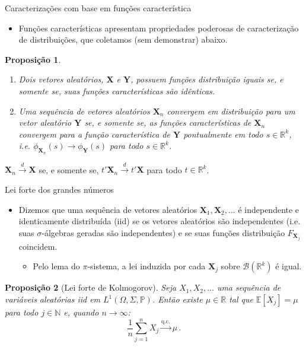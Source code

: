 \documentclass[11pt]{beamer}
\newtheorem{proposition}{Proposição}
\begin{document}
	\begin{frame}{Caracterizações com base em funções característica}
		\begin{itemize}
			\item Funções características apresentam propriedades poderosas de caracterização de distribuições, que coletamos (sem demonstrar) abaixo.
		\end{itemize}
		\begin{proposition}
		\begin{enumerate}
			\item Dois vetores aleatórios, $\boldsymbol{X}$ e $\boldsymbol{Y}$, possuem funções distribuição iguais se, e somente se, suas funções características são idênticas.
			\item Uma sequência de vetores aleatórios $\boldsymbol{X}_n$ convergem em distribuição para um vetor aleatório $\boldsymbol{Y}$ se, e somente se, as funções características de $\boldsymbol{X}_n$ convergem para a função característica de $\boldsymbol{Y}$ pontualmente em todo $s \in \mathbb{R}^k$, i.e. $\phi_{\boldsymbol{X}_n}(s) \to \phi_{\boldsymbol{Y}}(s)$ para todo $s \in \mathbb{R}^k$. 
		\end{enumerate}
		\end{proposition}
		\begin{corollary}
			$\boldsymbol{X}_n \overset{d}{\to} \boldsymbol{X}$ se, e somente se, $t'\boldsymbol{X}_n  \overset{d}{\to} t'\boldsymbol{X}$ para todo $t \in \mathbb{R}^k$.
		\end{corollary}
	\end{frame}
	
	\begin{frame}{Lei forte dos grandes números}
		\begin{itemize}
			\item Dizemos que uma sequência de vetores aleatórios $\boldsymbol{X}_1, \boldsymbol{X}_2, \ldots$ é independente e identicamente distribuída (iid) se os vetores aleatórios são independentes (i.e. suas $\sigma$-álgebras geradas são independentes) e se suas funções distribuição $F_{\boldsymbol{X}_j}$ coincidem.
			\begin{itemize}
				\item Pelo lema do $\pi$-sistema, a lei induzida por cada $\boldsymbol{X}_j$ sobre $\mathcal{B}(\mathbb{R}^k)$ é igual.
			\end{itemize}
		\end{itemize}
	\begin{proposition}[Lei forte de Kolmogorov]
			Seja $X_1, X_2,\ldots$ uma sequência de variáveis aleatórias iid em $L^1(\Omega,\Sigma,\mathbb{P})$.
			Então existe $\mu \in \mathbb{R}$ tal que $\mathbb{E}[X_j] = \mu$ para todo $j\in \mathbb{N}$ e, quando $n \to \infty$:
$$\frac{1}{n}\sum_{j=1}^n X_j \overset{\text{q.c.}}{\to} \mu\, .$$
	\end{proposition}

	\end{frame}
	
\end{document}
